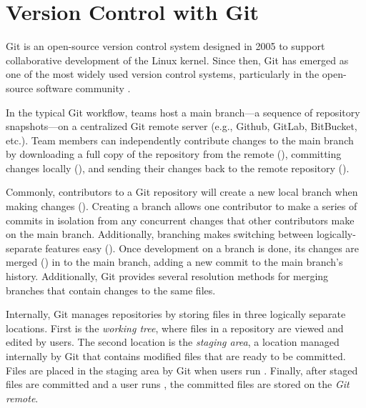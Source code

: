\section{Version Control with Git}

Git is an open-source version control system designed in 2005 to support collaborative development of the Linux kernel. Since then, Git has emerged as one of the most widely used version control systems, particularly in the open-source software community \cite{TODO}.

In the typical Git workflow, teams host a main branch---a sequence of repository snapshots---on a centralized Git remote server (e.g., Github, GitLab, BitBucket, etc.). 
Team members can independently contribute changes to the main branch by downloading a full copy of the repository from the remote (), committing changes locally (), and sending their changes back to the remote repository ().

Commonly, contributors to a Git repository will create a new local branch when making changes (). Creating a branch allows one contributor to make a series of commits in isolation from any concurrent changes that other contributors make on the main branch. Additionally, branching makes switching between logically-separate features easy (). Once development on a branch is done, its changes are merged () in to the main branch, adding a new commit to the main branch's history. Additionally, Git provides several resolution methods for merging branches that contain changes to the same files. 

Internally, Git manages repositories by storing files in three logically separate locations. First is the \emph{working tree}, where files in a repository are viewed and edited by users. The second location is the \emph{staging area}, a location managed internally by Git that contains modified files that are ready to be committed. Files are placed in the staging area by Git when users run . Finally, after staged files are committed and a user runs , the committed files are stored on the \emph{Git remote}. 


